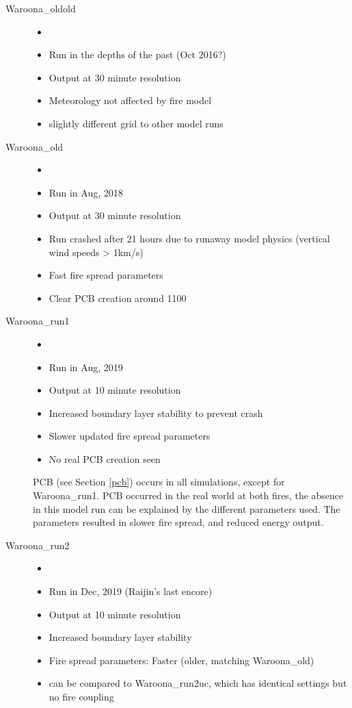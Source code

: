     \begin{description}
      \item [Waroona\_oldold]
      \begin{itemize}
        \item [] %
        \item Run in the depths of the past (Oct 2016?)
        \item Output at 30 minute resolution
        \item Meteorology not affected by fire model
        \item slightly different grid to other model runs
      \end{itemize}
      \item [Waroona\_old]
      
      \begin{itemize}
        \item []
        \item Run in Aug, 2018
        \item Output at 30 minute resolution
        \item Run crashed after 21 hours due to runaway model physics (vertical wind speeds > 1km/s)
        \item Fast fire spread parameters
        \item Clear PCB creation around 1100
      \end{itemize}
      
      \item [Waroona\_run1]
      \begin{itemize}
        \item []
        \item Run in Aug, 2019
        \item Output at 10 minute resolution
        \item Increased boundary layer stability to prevent crash
        \item Slower updated fire spread parameters
        \item No real PCB creation seen
      \end{itemize}
      PCB (see Section \ref{pcb}) occurs in all simulations, except for Waroona\_run1.
      PCB occurred in the real world at both fires, the absence in this model run can be explained by the different parameters used. 
      The parameters resulted in slower fire spread, and reduced energy output.
      
      \item [Waroona\_run2]
      \begin{itemize}
        \item []
        \item Run in Dec, 2019 (Raijin's last encore)
        \item Output at 10 minute resolution
        \item Increased boundary layer stability
        \item Fire spread parameters: Faster (older, matching Waroona\_old)
        \item can be compared to Waroona\_run2uc, which has identical settings but no fire coupling
      \end{itemize}
      

\end{description}
